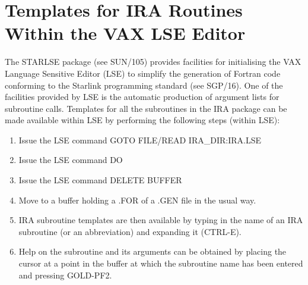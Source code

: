 \section {Templates for IRA Routines Within the VAX LSE Editor}
The STARLSE package (see SUN/105) provides facilities for initialising the VAX
Language Sensitive Editor (LSE) to simplify the generation of Fortran
code conforming to the Starlink programming standard (see SGP/16). One of the
facilities provided by LSE is the automatic production of argument lists for
subroutine calls. Templates for all the subroutines in the IRA package can be 
made available within LSE by performing the following steps (within LSE):
\begin{enumerate}
\item Issue the LSE command GOTO FILE/READ IRA\_DIR:IRA.LSE
\item Issue the LSE command DO
\item Issue the LSE command DELETE BUFFER
\item Move to a buffer holding a .FOR of a .GEN file in the usual way.
\item IRA subroutine templates are then available by typing in the name of an 
IRA subroutine (or an abbreviation) and expanding it (CTRL-E).
\item Help on the subroutine and its arguments can be obtained by placing the
cursor at a point in the buffer at which the subroutine name has been entered 
and pressing GOLD-PF2.
\end{enumerate}

